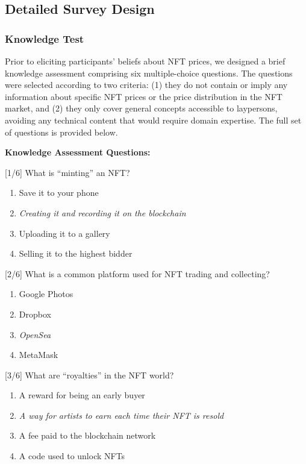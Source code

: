 \documentclass[12pt,reqno]{amsart}
\begin{document}
\subsection{Detailed Survey Design}

\subsubsection{Knowledge Test}
Prior to eliciting participants' beliefs about NFT prices, we designed a brief knowledge assessment comprising six multiple-choice questions. The questions were selected according to two criteria: (1) they do not contain or imply any information about specific NFT prices or the price distribution in the NFT market, and (2) they only cover general concepts accessible to laypersons, avoiding any technical content that would require domain expertise. The full set of questions is provided below.

\textbf{Knowledge Assessment Questions:}

[1/6] What is ``minting'' an NFT?
\begin{enumerate}
    \item Save it to your phone
    \item \textit{Creating it and recording it on the blockchain}
    \item Uploading it to a gallery
    \item Selling it to the highest bidder
\end{enumerate}

[2/6] What is a common platform used for NFT trading and collecting?
\begin{enumerate}
    \item Google Photos
    \item Dropbox
    \item \textit{OpenSea}
    \item MetaMask
\end{enumerate}

[3/6] What are ``royalties'' in the NFT world?
\begin{enumerate}
    \item A reward for being an early buyer
    \item \textit{A way for artists to earn each time their NFT is resold}
    \item A fee paid to the blockchain network
    \item A code used to unlock NFTs
\end{enumerate}
\end{document}
